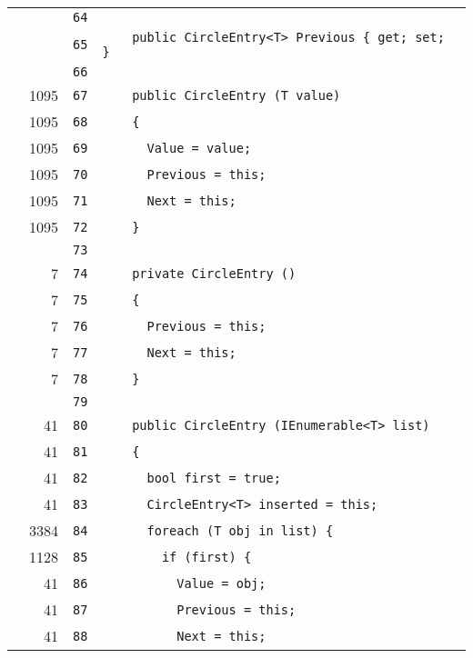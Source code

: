 \documentclass[a4paper,10pt]{article}
\begin{document}
\begin{longtable}[l]{lrrl}
\cellcolor{gray} &  & \verb~64~ & \verb~~\\
\cellcolor{gray} &  & \verb~65~ & \verb~    public CircleEntry<T> Previous { get; set; }~\\
\cellcolor{gray} &  & \verb~66~ & \verb~~\\
\cellcolor{green} & 1095 & \verb~67~ & \verb~    public CircleEntry (T value)~\\
\cellcolor{green} & 1095 & \verb~68~ & \verb~    {~\\
\cellcolor{green} & 1095 & \verb~69~ & \verb~      Value = value;~\\
\cellcolor{green} & 1095 & \verb~70~ & \verb~      Previous = this;~\\
\cellcolor{green} & 1095 & \verb~71~ & \verb~      Next = this;~\\
\cellcolor{green} & 1095 & \verb~72~ & \verb~    }~\\
\cellcolor{gray} &  & \verb~73~ & \verb~~\\
\cellcolor{green} & 7 & \verb~74~ & \verb~    private CircleEntry ()~\\
\cellcolor{green} & 7 & \verb~75~ & \verb~    {~\\
\cellcolor{green} & 7 & \verb~76~ & \verb~      Previous = this;~\\
\cellcolor{green} & 7 & \verb~77~ & \verb~      Next = this;~\\
\cellcolor{green} & 7 & \verb~78~ & \verb~    }~\\
\cellcolor{gray} &  & \verb~79~ & \verb~~\\
\cellcolor{green} & 41 & \verb~80~ & \verb~    public CircleEntry (IEnumerable<T> list)~\\
\cellcolor{green} & 41 & \verb~81~ & \verb~    {~\\
\cellcolor{green} & 41 & \verb~82~ & \verb~      bool first = true;~\\
\cellcolor{green} & 41 & \verb~83~ & \verb~      CircleEntry<T> inserted = this;~\\
\cellcolor{green} & 3384 & \verb~84~ & \verb~      foreach (T obj in list) {~\\
\cellcolor{green} & 1128 & \verb~85~ & \verb~        if (first) {~\\
\cellcolor{green} & 41 & \verb~86~ & \verb~          Value = obj;~\\
\cellcolor{green} & 41 & \verb~87~ & \verb~          Previous = this;~\\
\cellcolor{green} & 41 & \verb~88~ & \verb~          Next = this;~\\

\end{longtable}
\end{document}
